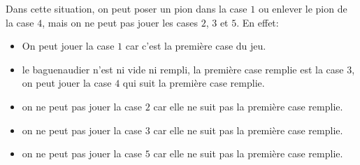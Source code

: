     \medskip


\noindent Dans cette situation, on peut poser un pion dans la case $1$ ou enlever le pion de la case $4$, mais on ne peut pas jouer les cases $2$, $3$ et $5$. En effet:
\begin{itemize}
    \item On peut jouer la case $1$ car c'est la première case du jeu.
    \item le baguenaudier n'est ni vide ni rempli, la première case remplie est la case $3$, on peut jouer la case $4$ qui suit la première case remplie.
    \item on ne peut pas jouer la case $2$ car elle ne suit pas la première case remplie.
    \item on ne peut pas jouer la case $3$ car elle ne suit pas la première case remplie.
    \item on ne peut pas jouer la case $5$ car elle ne suit pas la première case remplie.   
\end{itemize}

\bigskip

